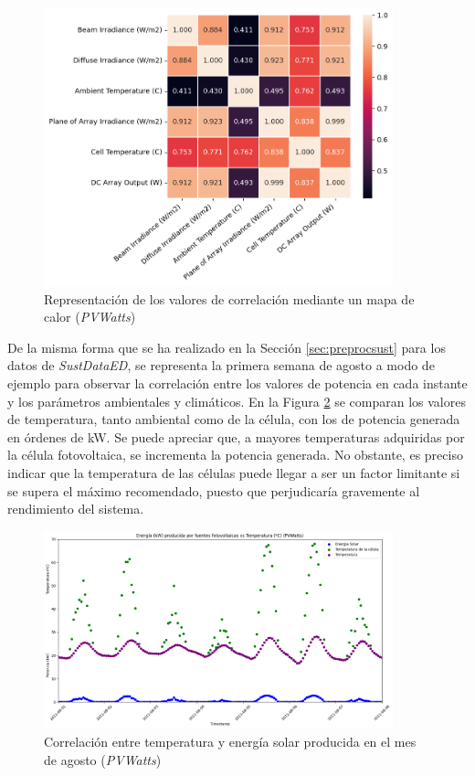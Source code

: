 \begin{figure}[H]
  \centering
  \includegraphics[width=0.9\textwidth]{img/diseno/corr.png}
  \caption{Representación de los valores de correlación mediante un mapa de calor (\textit{PVWatts})}
  \label{fig:corr}
\end{figure}

De la misma forma que se ha realizado en la Sección \ref{sec:preprocsust} para los datos de \textit{SustDataED}, se representa la primera semana de agosto a modo de ejemplo para observar la correlación entre los valores de potencia en cada instante y los parámetros ambientales y climáticos. En la Figura \ref{fig:energiavstempcel} se comparan los valores de temperatura, tanto ambiental como de la célula, con los de potencia generada en órdenes de kW. Se puede apreciar que, a mayores temperaturas adquiridas por la célula fotovoltaica, se incrementa la potencia generada. No obstante, es preciso indicar que la temperatura de las células puede llegar a ser un factor limitante si se supera el máximo recomendado, puesto que perjudicaría gravemente al rendimiento del sistema.

\vspace{3mm}

\begin{figure}[H]
  \centering
  \includegraphics[width=0.9\textwidth]{img/diseno/energiavstempcel.png}
  \caption{Correlación entre temperatura y energía solar producida en el mes de agosto (\textit{PVWatts})}
  \label{fig:energiavstempcel}
\end{figure}

